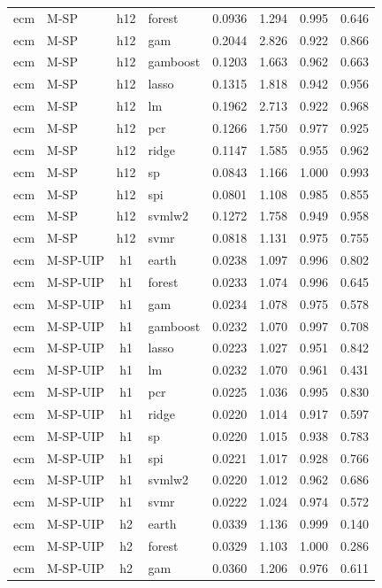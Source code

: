 \begin{ThreePartTable}
\begin{longtable}[t]{llclcccc}
ecm & M-SP & h12 & forest & 0.0936 & 1.294 & 0.995 & 0.646\\
ecm & M-SP & h12 & gam & 0.2044 & 2.826 & 0.922 & 0.866\\
ecm & M-SP & h12 & gamboost & 0.1203 & 1.663 & 0.962 & 0.663\\
ecm & M-SP & h12 & lasso & 0.1315 & 1.818 & 0.942 & 0.956\\
ecm & M-SP & h12 & lm & 0.1962 & 2.713 & 0.922 & 0.968\\
ecm & M-SP & h12 & pcr & 0.1266 & 1.750 & 0.977 & 0.925\\
ecm & M-SP & h12 & ridge & 0.1147 & 1.585 & 0.955 & 0.962\\
ecm & M-SP & h12 & sp & 0.0843 & 1.166 & 1.000 & 0.993\\
ecm & M-SP & h12 & spi & 0.0801 & 1.108 & 0.985 & 0.855\\
ecm & M-SP & h12 & svmlw2 & 0.1272 & 1.758 & 0.949 & 0.958\\
ecm & M-SP & h12 & svmr & 0.0818 & 1.131 & 0.975 & 0.755\\
\addlinespace
ecm & M-SP-UIP & h1 & earth & 0.0238 & 1.097 & 0.996 & 0.802\\
ecm & M-SP-UIP & h1 & forest & 0.0233 & 1.074 & 0.996 & 0.645\\
ecm & M-SP-UIP & h1 & gam & 0.0234 & 1.078 & 0.975 & 0.578\\
ecm & M-SP-UIP & h1 & gamboost & 0.0232 & 1.070 & 0.997 & 0.708\\
ecm & M-SP-UIP & h1 & lasso & 0.0223 & 1.027 & 0.951 & 0.842\\
ecm & M-SP-UIP & h1 & lm & 0.0232 & 1.070 & 0.961 & 0.431\\
ecm & M-SP-UIP & h1 & pcr & 0.0225 & 1.036 & 0.995 & 0.830\\
ecm & M-SP-UIP & h1 & ridge & 0.0220 & 1.014 & 0.917 & 0.597\\
ecm & M-SP-UIP & h1 & sp & 0.0220 & 1.015 & 0.938 & 0.783\\
ecm & M-SP-UIP & h1 & spi & 0.0221 & 1.017 & 0.928 & 0.766\\
ecm & M-SP-UIP & h1 & svmlw2 & 0.0220 & 1.012 & 0.962 & 0.686\\
ecm & M-SP-UIP & h1 & svmr & 0.0222 & 1.024 & 0.974 & 0.572\\
\addlinespace
ecm & M-SP-UIP & h2 & earth & 0.0339 & 1.136 & 0.999 & 0.140\\
ecm & M-SP-UIP & h2 & forest & 0.0329 & 1.103 & 1.000 & 0.286\\
ecm & M-SP-UIP & h2 & gam & 0.0360 & 1.206 & 0.976 & 0.611\\

\end{longtable}
\end{ThreePartTable}
